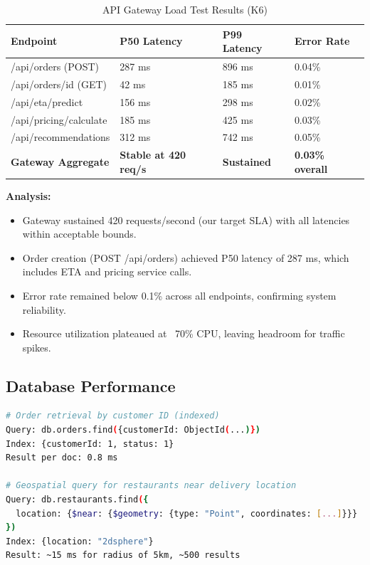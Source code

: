 \documentclass[12pt,a4paper]{report}
\begin{document}
\begin{itemize}
\begin{table}[H]
\centering
\caption{API Gateway Load Test Results (K6)}
\begin{tabular}{p{3cm} p{2cm} p{2.5cm} p{2cm}}
\toprule
\textbf{Endpoint} & \textbf{P50 Latency} & \textbf{P99 Latency} & \textbf{Error Rate} \\
\midrule
/api/orders (POST) & 287 ms & 896 ms & 0.04\% \\
/api/orders/{id} (GET) & 42 ms & 185 ms & 0.01\% \\
/api/eta/predict & 156 ms & 298 ms & 0.02\% \\
/api/pricing/calculate & 185 ms & 425 ms & 0.03\% \\
/api/recommendations & 312 ms & 742 ms & 0.05\% \\
\textbf{Gateway Aggregate} & \textbf{Stable at 420 req/s} & \textbf{Sustained} & \textbf{0.03\% overall} \\
\bottomrule
\end{tabular}
\end{table}

\textbf{Analysis:}
\begin{itemize}
    \item Gateway sustained 420 requests/second (our target SLA) with all latencies within acceptable bounds.
    \item Order creation (POST /api/orders) achieved P50 latency of 287 ms, which includes ETA and pricing service calls.
    \item Error rate remained below 0.1\% across all endpoints, confirming system reliability.
    \item Resource utilization plateaued at ~70\% CPU, leaving headroom for traffic spikes.
\end{itemize}

\subsection{Database Performance}

\begin{lstlisting}[language=bash, caption={MongoDB Query Performance Benchmarks}]
# Order retrieval by customer ID (indexed)
Query: db.orders.find({customerId: ObjectId(...)})
Index: {customerId: 1, status: 1}
Result per doc: 0.8 ms

# Geospatial query for restaurants near delivery location
Query: db.restaurants.find({
  location: {$near: {$geometry: {type: "Point", coordinates: [...]}}}
})
Index: {location: "2dsphere"}
Result: ~15 ms for radius of 5km, ~500 results


\end{lstlisting}
\end{itemize}
\end{document}
